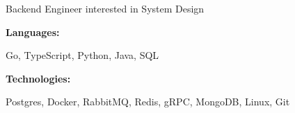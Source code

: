 \documentclass[9pt]{developercv} %
\begin{document}
\begin{minipage}[t]{0.46\textwidth}
	\vspace{-6pt}
Backend Engineer interested in System Design
\end{minipage}
\hfill %
\begin{minipage}[t]{0.465\textwidth}
    \vspace{-6pt}
    
    \begin{minipage}[t]{0.2\textwidth}
        \textbf{Languages:}
    \end{minipage}
    \hfill
    \begin{minipage}[t]{0.73\textwidth}
      Go, TypeScript, Python, Java, SQL
    \end{minipage}
    \vspace{4mm}
    
    \begin{minipage}[t]{0.2\textwidth}
        \textbf{Technologies:}
    \end{minipage}
    \hfill
    \begin{minipage}[t]{0.73\textwidth}
      Postgres, Docker, RabbitMQ, Redis, gRPC, MongoDB, Linux, Git
    \end{minipage}
    
\end{minipage}
\end{document}
